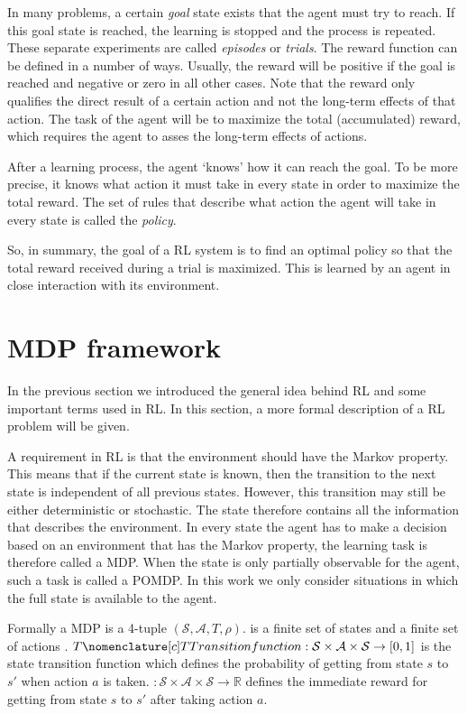 In many problems, a certain \emph{goal} state exists that the agent must try to reach. If this goal state is reached, the learning is stopped and the process is repeated. These separate experiments are called \emph{episodes} or \emph{trials}. The reward function can be defined in a number of ways. Usually, the reward will be positive if the goal is reached and negative or zero in all other cases. Note that the reward only qualifies the direct result of a certain action and not the long-term effects of that action. The task of the agent will be to maximize the total (accumulated) reward, which requires the agent to asses the long-term effects of actions.

After a learning process, the agent `knows' how it can reach the goal. To be more precise, it knows what action it must take in every state in order to maximize the total reward. The set of rules that describe what action the agent will take in every state is called the \emph{policy}.

So, in summary, the goal of a \ac{RL} system is to find an optimal policy so that the total reward received during a trial is maximized. This is learned by an agent in close interaction with its environment. 

\section{MDP framework}\label{sec:RL-MDP_framework}
In the previous section we introduced the general idea behind \ac{RL} and some important terms used in \ac{RL}. In this section, a more formal description of a \ac{RL} problem will be given.

A requirement in \ac{RL} is that the environment should have the Markov property. This means that if the current state is known, then the transition to the next state is independent of all previous states. However, this transition may still be either deterministic or stochastic. The state therefore contains all the information that describes the environment. In every state the agent has to make a decision based on an environment that has the Markov property, the learning task is therefore called a \ac{MDP}. When the state is only partially observable for the agent, such a task is called a \ac{POMDP}. In this work we only consider situations in which the full state is available to the agent.

Formally a \ac{MDP} is a 4-tuple $(\mathcal{S},\mathcal{A},T,\rho)$.  is a finite set of states  and  a finite set of actions . $\lsymb{T}{Transition function}:\mathcal{S}\times \mathcal{A}\times \mathcal{S} \rightarrow [0,1]$ is the state transition function which defines the probability of getting from state $s$ to $s'$ when action $a$ is taken. $:\mathcal{S}\times \mathcal{A}\times \mathcal{S} \rightarrow  \mathbb{R}$ defines the immediate reward  for getting from state $s$ to $s'$ after taking action $a$. 

